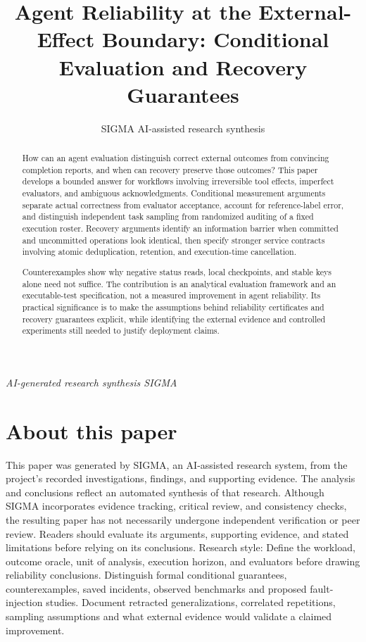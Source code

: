 \documentclass[11pt]{article}
\title{Agent Reliability at the External-Effect Boundary: Conditional Evaluation and Recovery Guarantees}
\date{}
\author{SIGMA AI-assisted research synthesis}
\begin{document}
\maketitle
\begin{center}\end{center}
\begin{center}\small\textit{AI-generated research synthesis \textperiodcentered{} SIGMA}\end{center}

\begin{abstract}
How can an agent evaluation distinguish correct external outcomes from convincing completion reports, and when can recovery preserve those outcomes? This paper develops a bounded answer for workflows involving irreversible tool effects, imperfect evaluators, and ambiguous acknowledgments. Conditional measurement arguments separate actual correctness from evaluator acceptance, account for reference-label error, and distinguish independent task sampling from randomized auditing of a fixed execution roster. Recovery arguments identify an information barrier when committed and uncommitted operations look identical, then specify stronger service contracts involving atomic deduplication, retention, and execution-time cancellation.

Counterexamples show why negative status reads, local checkpoints, and stable keys alone need not suffice. The contribution is an analytical evaluation framework and an executable-test specification, not a measured improvement in agent reliability. Its practical significance is to make the assumptions behind reliability certificates and recovery guarantees explicit, while identifying the external evidence and controlled experiments still needed to justify deployment claims.
\end{abstract}
\section*{About this paper}
This paper was generated by SIGMA, an AI-assisted research system, from the project's recorded investigations, findings, and supporting evidence.
The analysis and conclusions reflect an automated synthesis of that research. Although SIGMA incorporates evidence tracking, critical review, and consistency checks, the resulting paper has not necessarily undergone independent verification or peer review.
Readers should evaluate its arguments, supporting evidence, and stated limitations before relying on its conclusions.
Research style: Define the workload, outcome oracle, unit of analysis, execution horizon, and evaluators before drawing reliability conclusions. Distinguish formal conditional guarantees, counterexamples, saved incidents, observed benchmarks and proposed fault-injection studies. Document retracted generalizations, correlated repetitions, sampling assumptions and what external evidence would validate a claimed improvement.
\end{document}
